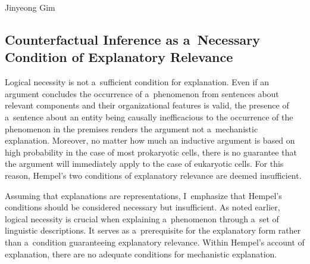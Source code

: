 \begin{artengenv}{Jinyeong Gim}
\subsection{Counterfactual Inference as a~Necessary Condition of Explanatory Relevance}

Logical necessity is not a~sufficient condition for explanation. Even if an argument concludes the occurrence of a~phenomenon from sentences about relevant components and their organizational features is valid, the presence of a~sentence about an entity being causally inefficacious to the occurrence of the phenomenon in the premises renders the argument not a~mechanistic explanation. Moreover, no matter how much an inductive argument is based on high probability in the case of most prokaryotic cells, there is no guarantee that the argument will immediately apply to the case of eukaryotic cells. For this reason, Hempel's two conditions of explanatory relevance are deemed insufficient.

Assuming that explanations are representations, I~emphasize that Hempel's conditions should be considered necessary but insufficient. As noted earlier, logical necessity is crucial when explaining a~phenomenon through a~set of linguistic descriptions. It serves as a~prerequisite for the explanatory form rather than a~condition guaranteeing explanatory relevance. Within Hempel's account of explanation, there are no adequate conditions for mechanistic explanation.


\end{artengenv}
